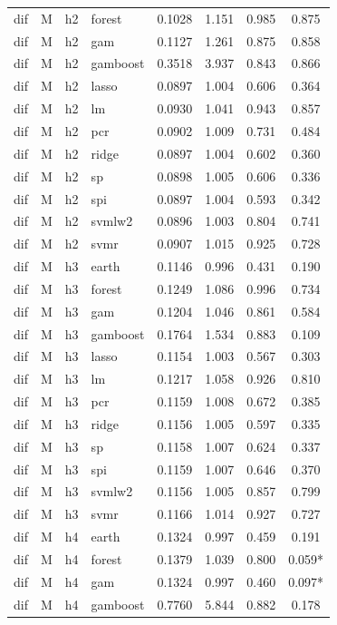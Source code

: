 \begin{ThreePartTable}
\begin{longtable}[t]{llclcccc}
dif & M & h2 & forest & 0.1028 & 1.151 & 0.985 & 0.875\\
dif & M & h2 & gam & 0.1127 & 1.261 & 0.875 & 0.858\\
dif & M & h2 & gamboost & 0.3518 & 3.937 & 0.843 & 0.866\\
dif & M & h2 & lasso & 0.0897 & 1.004 & 0.606 & 0.364\\
dif & M & h2 & lm & 0.0930 & 1.041 & 0.943 & 0.857\\
dif & M & h2 & pcr & 0.0902 & 1.009 & 0.731 & 0.484\\
dif & M & h2 & ridge & 0.0897 & 1.004 & 0.602 & 0.360\\
dif & M & h2 & sp & 0.0898 & 1.005 & 0.606 & 0.336\\
dif & M & h2 & spi & 0.0897 & 1.004 & 0.593 & 0.342\\
dif & M & h2 & svmlw2 & 0.0896 & 1.003 & 0.804 & 0.741\\
dif & M & h2 & svmr & 0.0907 & 1.015 & 0.925 & 0.728\\
\addlinespace
dif & M & h3 & earth & 0.1146 & 0.996 & 0.431 & 0.190\\
dif & M & h3 & forest & 0.1249 & 1.086 & 0.996 & 0.734\\
dif & M & h3 & gam & 0.1204 & 1.046 & 0.861 & 0.584\\
dif & M & h3 & gamboost & 0.1764 & 1.534 & 0.883 & 0.109\\
dif & M & h3 & lasso & 0.1154 & 1.003 & 0.567 & 0.303\\
dif & M & h3 & lm & 0.1217 & 1.058 & 0.926 & 0.810\\
dif & M & h3 & pcr & 0.1159 & 1.008 & 0.672 & 0.385\\
dif & M & h3 & ridge & 0.1156 & 1.005 & 0.597 & 0.335\\
dif & M & h3 & sp & 0.1158 & 1.007 & 0.624 & 0.337\\
dif & M & h3 & spi & 0.1159 & 1.007 & 0.646 & 0.370\\
dif & M & h3 & svmlw2 & 0.1156 & 1.005 & 0.857 & 0.799\\
dif & M & h3 & svmr & 0.1166 & 1.014 & 0.927 & 0.727\\
\addlinespace
dif & M & h4 & earth & 0.1324 & 0.997 & 0.459 & 0.191\\
dif & M & h4 & forest & 0.1379 & 1.039 & 0.800 & 0.059*\\
dif & M & h4 & gam & 0.1324 & 0.997 & 0.460 & 0.097*\\
dif & M & h4 & gamboost & 0.7760 & 5.844 & 0.882 & 0.178\\

\end{longtable}
\end{ThreePartTable}
